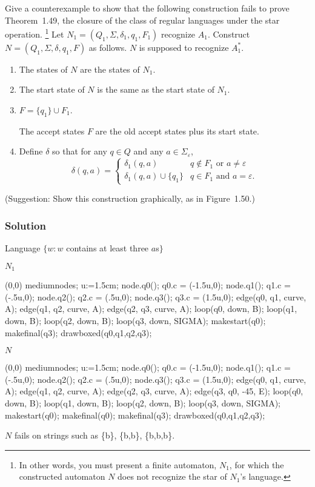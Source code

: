 \documentclass{article}
\begin{document}
\begin{empfile}
Give a counterexample to show that the following construction fails
to prove Theorem~1.49, the closure of the class of regular languages
under the star operation.%
\footnote{In other words, you must present a finite automaton,
$N_1$, for which the constructed automaton $N$ does not recognize
the star of $N_1$'s language.}
Let $N_1=(Q_1,\Sigma,\delta_1,q_1,F_1)$ recognize $A_1$. Construct
$N=(Q_1,\Sigma,\delta,q_1,F)$ as follows. $N$ is supposed to
recognize $A^*_1$.

\begin{enumerate}
\renewcommand{\labelenumi}{\alph{enumi}}
\item The states of $N$ are the states of $N_1$.
\item The start state of $N$ is the same as the start state of $N_1$.
\item $F=\{q_1\}\cup F_1$.

The accept states $F$ are the old accept states plus its start state.
\item Define $\delta$ so that for any $q\in Q$ and any
$a\in\Sigma_\varepsilon$,
$$
\delta(q,a)=
\begin{cases}
\delta_1(q,a) & q\notin F_1\text{ or }a\neq\varepsilon \\
\delta_1(q,a)\cup\{q_1\} & q\in F_1\text{ and }a=\varepsilon.
\end{cases}
$$
\end{enumerate}
(Suggestion: Show this construction graphically, as in Figure~1.50.)

\subsubsection*{Solution}

\text Language $\{w:w$ contains at least three $a$s$\}$

$N_1$
	\begin{center}
	\begin{emp}(0,0)
	mediumnodes;
	u:=1.5cm;
	node.q0(); q0.c = (-1.5u,0);
	node.q1(); q1.c = (-.5u,0);
	node.q2(); q2.c = (.5u,0);
	node.q3(); q3.c = (1.5u,0);
	edge(q0, q1, curve, A);
	edge(q1, q2, curve, A);
	edge(q2, q3, curve, A);
	loop(q0, down, B);
	loop(q1, down, B);
	loop(q2, down, B);
	loop(q3, down, SIGMA);
	makestart(q0);
	makefinal(q3);
	drawboxed(q0,q1,q2,q3);
	\end{emp}
	\end{center}
$N$
	\begin{center}
	\begin{emp}(0,0)
	mediumnodes;
	u:=1.5cm;
	node.q0(); q0.c = (-1.5u,0);
	node.q1(); q1.c = (-.5u,0);
	node.q2(); q2.c = (.5u,0);
	node.q3(); q3.c = (1.5u,0);
	edge(q0, q1, curve, A);
	edge(q1, q2, curve, A);
	edge(q2, q3, curve, A);
	edge(q3, q0, -45, E);
	loop(q0, down, B);
	loop(q1, down, B);
	loop(q2, down, B);
	loop(q3, down, SIGMA);
	makestart(q0);
	makefinal(q0);
	makefinal(q3);
	drawboxed(q0,q1,q2,q3);
	\end{emp}
	\end{center}
$N$ fails on strings such as \{b\}, \{b,b\}, \{b,b,b\}. 


\end{empfile}
\end{document}
